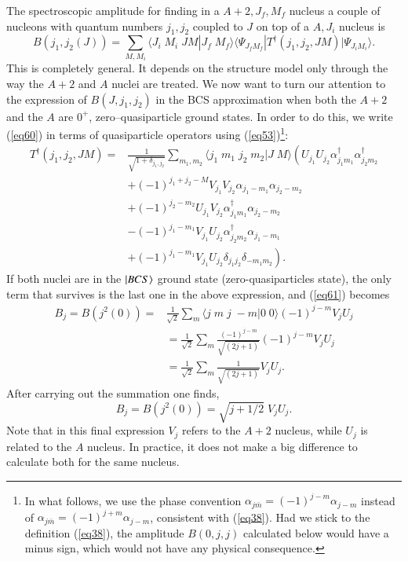 \begin{subappendices}
The spectroscopic amplitude for finding in a $A+2,J_f,M_f$ nucleus a couple of nucleons with quantum numbers $j_1,j_2$ coupled to $J$ on top of a $A,J_i$ nucleus is
\begin{equation}\label{eq61}
B(j_1,j_2(J))=\sum_{M,M_i} \langle J_i \; M_i \; J M|J_f \; M_f\rangle \langle \Psi_{J_f M_f}|T^\dagger(j_1,j_2,J M)|\Psi_{J_i M_i}\rangle.
\end{equation}
This is completely general. It depends on the structure model only through the way the $A+2$ and $A$ nuclei are treated. We now want to turn our attention to the expression of $B(J,j_1,j_2)$ in the BCS approximation when both the $A+2$ and the $A$ are $0^+$, zero--quasiparticle ground states. In order to do this, we write (\ref{eq60}) in terms of quasiparticle operators using (\ref{eq53})\footnote{In what follows, we use the phase convention $\alpha_{j \bar m}=(-1)^{j-m}\alpha_{j-m}$ instead of $\alpha_{j \bar m}=(-1)^{j+m}\alpha_{j-m}$, consistent with (\ref{eq38}). Had we stick to the definition (\ref{eq38}), the amplitude $B(0,j,j)$ calculated below would have a minus sign, which would not have any physical consequence.}:
\begin{equation}\label{eq62}
    \begin{split}
       T^\dagger(j_1,j_2,J M)= & \frac{1}{\sqrt{1+\delta_{j_1,j_2}}}\sum_{m_1,m_2} \langle j_1 \; m_1 \;j_2 \;m_2|J \; M\rangle \left( U_{j_1}U_{j_2}\alpha_{j_1m_1}^\dagger\alpha_{j_2m_2}^\dagger\right.\\
         &  +(-1)^{j_1+j_2-M}V_{j_1}V_{j_2}\alpha_{j_1-m_1}\alpha_{j_2-m_2}\\
         &+(-1)^{j_2-m_2}U_{j_1}V_{j_2}\alpha_{j_1m_1}^\dagger
         \alpha_{j_2-m_2}\\
         &-(-1)^{j_1-m_1} V_{j_1}U_{j_2}\alpha_{j_2m_2}^\dagger\alpha_{j_1-m_1}\\
         &\left.+(-1)^{j_1-m_1} V_{j_1}U_{j_2}\delta_{j_1j_2}\delta_{-m_1m_2}\right).
     \end{split}
\end{equation}
If both nuclei are in the $|{BCS} \rangle$ ground state (zero-quasiparticles state), the only term that survives is the last one in the above expression, and (\ref{eq61}) becomes
\begin{equation}\label{eq63}
    \begin{split}
     B_j=B(j^2(0))=& \frac{1}{\sqrt 2}\sum_{m} \langle j \; m \; j\;-m |0 \; 0\rangle (-1)^{j-m} V_jU_j\\
         &=\frac{1}{\sqrt 2}\sum_{m} \frac{(-1)^{j-m}}{\sqrt{(2j+1)}} (-1)^{j-m} V_jU_j\\
         &=\frac{1}{\sqrt 2}\sum_{m} \frac{1}{\sqrt{(2j+1)}}V_jU_j.
     \end{split}
\end{equation}
After carrying out the summation one finds,
\begin{equation}\label{eq64}
 B_j=B(j^2(0))=\sqrt{j+1/2}\;V_jU_j.
\end{equation}
Note that in this final expression $V_j$ refers to the $A+2$ nucleus, while $U_j$ is related to the $A$ nucleus. In practice, it does not make a big difference to calculate both for the same nucleus.


\end{subappendices}
